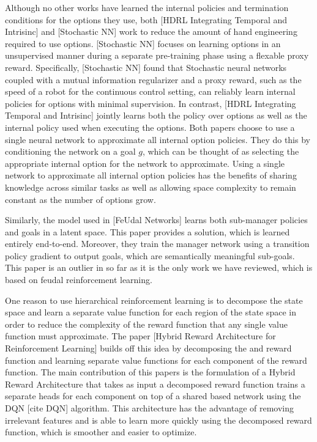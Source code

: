 Although no other works have learned the internal policies and termination conditions
for the options they use, both [HDRL Integrating Temporal and Intrisinc] and
[Stochastic NN] work to reduce the amount of hand engineering required
to use options. [Stochastic NN] focuses on learning options in an unsupervised manner
during a separate pre-training phase using a flexable proxy reward.
Specifically, [Stochastic NN] found that Stochastic neural networks coupled with
a mutual information regularizer and a proxy reward, such as the speed of a
robot for the continuous control setting, can reliably learn internal policies for
options with minimal supervision. In contrast,
[HDRL Integrating Temporal and Intrisinc] jointly learns both the policy over options
as well as the internal policy used when executing the options. Both papers choose to
use a single neural network to approximate all internal option policies. They do this
by conditioning the network on a goal $g$, which can be thought of as selecting the
appropriate internal option for the network to approximate. Using a single network
to approximate all internal option policies has the benefits of sharing knowledge
across similar tasks as well as allowing space complexity to remain constant as
the number of options grow.

Similarly, the model used in [FeUdal Networks] learns both sub-manager policies and
goals in a latent space. This paper provides a solution, which is learned entirely
end-to-end. Moreover, they train the manager network using a transition
policy gradient to output goals, which are semantically meaningful sub-goals.
This paper is an outlier in so far as it is the only work we have
reviewed, which is based on feudal reinforcement learning.

One reason to use hierarchical reinforcement learning is
to decompose the state space and learn a separate value function
for each region of the state space in order to reduce the complexity of the reward
function that any single value function must approximate. The paper
[Hybrid Reward Architecture for Reinforcement Learning] builds off this idea
by decomposing the and reward function and learning separate value functions for
each component of the reward function. The main contribution of this papers is
the formulation of a Hybrid Reward Architecture that takes as input a decomposed
reward function trains a separate heads for each component on top of a shared based
network using the DQN [cite DQN] algorithm. This architecture has the advantage of
removing irrelevant features and is able to learn more quickly using the decomposed
reward function, which is smoother and easier to optimize.

